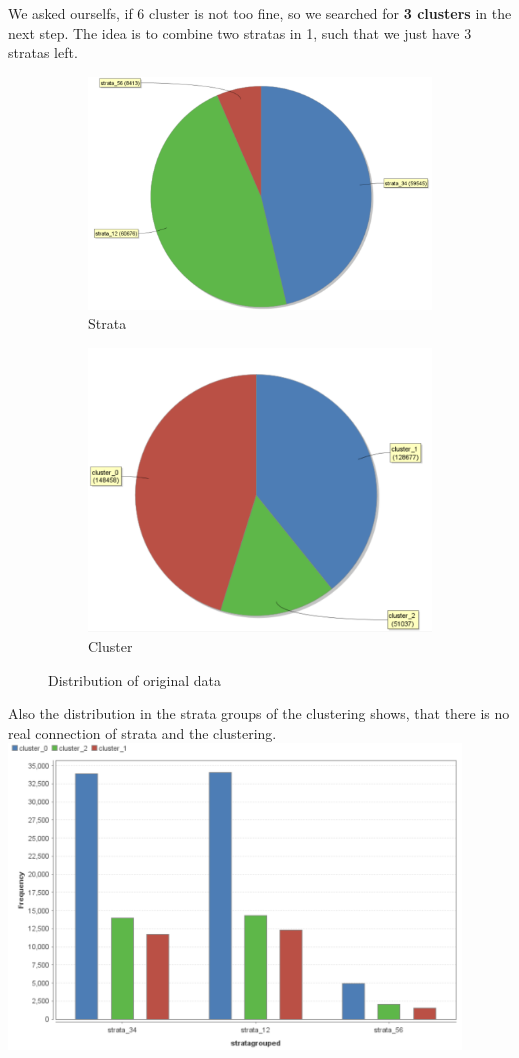 We asked ourselfs, if 6 cluster is not too fine, so we searched for \textbf{3 clusters} in the next step. The idea is to combine two stratas in 1, such that we just have 3 stratas left.
\begin{figure}[!htbp]
\centering
\begin{subfigure}{.5\textwidth}
  \centering
  \includegraphics[width=.4\linewidth]{ClusterOrigRapidStrata2Cluster.PNG}
  \caption{Strata}
  \label{fig:OrgSt}
\end{subfigure}%
\begin{subfigure}{.5\textwidth}
  \centering
  \includegraphics[width=.4\linewidth]{ClusterOrigRapidCluster2Cluster.PNG}
  \caption{Cluster}
  \label{fig:OrgCl}
\end{subfigure}
\caption{Distribution of original data}
\label{fig:OrgDist}
\end{figure}

Also the distribution in the strata groups of the clustering shows, that there is no real connection of strata and the clustering.
\includegraphics[width=0.9\textwidth]{ClusterOrigRapidDistribution2Cluster.PNG}

